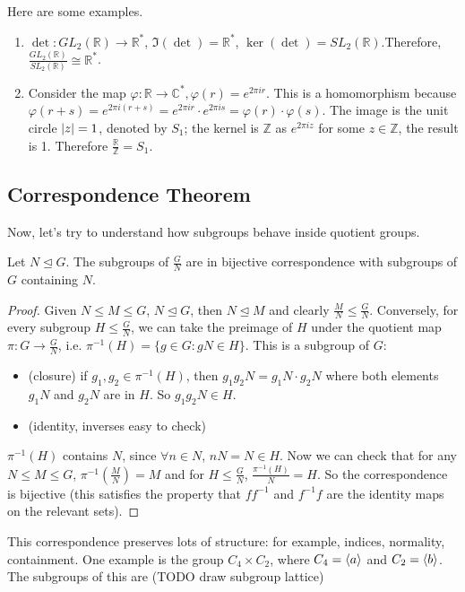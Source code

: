 Here are some examples.
\begin{enumerate}
	\item $\det : GL_2(\mathbb R) \to \mathbb R^*$, $\Im(\det) = \mathbb R^*$, $\ker(\det) = SL_2(\mathbb R)$.Therefore, $\frac{GL_2(\mathbb R)}{SL_2(\mathbb R)} \cong \mathbb R^*$.
	\item Consider the map $\varphi: \mathbb R \to \mathbb C^*, \varphi(r) = e^{2\pi i r}$. This is a homomorphism because $\varphi(r + s) = e^{2\pi i (r + s)} = e^{2 \pi i r}\cdot e^{2 \pi i s} = \varphi(r) \cdot \varphi(s)$. The image is the unit circle $\abs{z} = 1$, denoted by $S_1$; the kernel is $\mathbb Z$ as $e^{2 \pi i z}$ for some $z \in \mathbb Z$, the result is 1. Therefore $\frac{\mathbb R}{\mathbb Z} = S_1$.
\end{enumerate}

\subsection{Correspondence Theorem}
Now, let's try to understand how subgroups behave inside quotient groups.
\begin{theorem}
	Let $N \trianglelefteq G$. The subgroups of $\frac{G}{N}$ are in bijective correspondence with subgroups of $G$ containing $N$.
\end{theorem}
\begin{proof}
	Given $N \leq M \leq G$, $N \trianglelefteq G$, then $N \trianglelefteq M$ and clearly $\frac{M}{N} \leq \frac{G}{N}$. Conversely, for every subgroup $H \leq \frac{G}{N}$, we can take the preimage of $H$ under the quotient map $\pi : G \to \frac{G}{N}$, i.e. $\pi^{-1}(H) = \{ g \in G : gN \in H \}$. This is a subgroup of $G$:
	\begin{itemize}
		\item (closure) if $g_1, g_2 \in \pi^{-1}(H)$, then $g_1g_2N = g_1N\cdot g_2N$ where both elements $g_1N$ and $g_2N$ are in $H$. So $g_1g_2N \in H$.
		\item (identity, inverses easy to check)
	\end{itemize}
	$\pi^{-1}(H)$ contains $N$, since $\forall n \in N$, $nN = N \in H$. Now we can check that for any $N \leq M \leq G$, $\pi^{-1}(\frac{M}{N}) = M$ and for $H \leq \frac{G}{N}$, $\frac{\pi^{-1}(H)}{N} = H$. So the correspondence is bijective (this satisfies the property that $ff^{-1}$ and $f^{-1}f$ are the identity maps on the relevant sets).
\end{proof}
This correspondence preserves lots of structure: for example, indices, normality, containment. One example is the group $C_4 \times C_2$, where $C_4 = \langle a \rangle$ and $C_2 = \langle b \rangle$. The subgroups of this are (TODO draw subgroup lattice)
